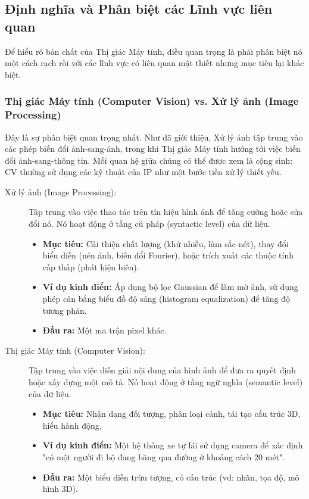 \subsection{Định nghĩa và Phân biệt các Lĩnh vực liên quan}

Để hiểu rõ bản chất của Thị giác Máy tính, điều quan trọng là phải phân biệt nó một cách rạch ròi với các lĩnh vực có liên quan mật thiết nhưng mục tiêu lại khác biệt.

\subsubsection{Thị giác Máy tính (Computer Vision) vs. Xử lý ảnh (Image Processing)}

Đây là sự phân biệt quan trọng nhất. Như đã giới thiệu, Xử lý ảnh tập trung vào các phép biến đổi ảnh-sang-ảnh, trong khi Thị giác Máy tính hướng tới việc biến đổi ảnh-sang-thông tin. Mối quan hệ giữa chúng có thể được xem là cộng sinh: CV thường sử dụng các kỹ thuật của IP như một bước tiền xử lý thiết yếu.

\begin{description}
    \item[Xử lý ảnh (Image Processing):] Tập trung vào việc thao tác trên tín hiệu hình ảnh để tăng cường hoặc sửa đổi nó. Nó hoạt động ở tầng cú pháp (syntactic level) của dữ liệu.
    \begin{itemize}
        \item \textbf{Mục tiêu:} Cải thiện chất lượng (khử nhiễu, làm sắc nét), thay đổi biểu diễn (nén ảnh, biến đổi Fourier), hoặc trích xuất các thuộc tính cấp thấp (phát hiện biên).
        \item \textbf{Ví dụ kinh điển:} Áp dụng bộ lọc Gaussian để làm mờ ảnh, sử dụng phép cân bằng biểu đồ độ sáng (histogram equalization) để tăng độ tương phản.
        \item \textbf{Đầu ra:} Một ma trận pixel khác.
    \end{itemize}
    \item[Thị giác Máy tính (Computer Vision):] Tập trung vào việc diễn giải nội dung của hình ảnh để đưa ra quyết định hoặc xây dựng một mô tả. Nó hoạt động ở tầng ngữ nghĩa (semantic level) của dữ liệu.
    \begin{itemize}
        \item \textbf{Mục tiêu:} Nhận dạng đối tượng, phân loại cảnh, tái tạo cấu trúc 3D, hiểu hành động.
        \item \textbf{Ví dụ kinh điển:} Một hệ thống xe tự lái sử dụng camera để xác định "có một người đi bộ đang băng qua đường ở khoảng cách 20 mét".
        \item \textbf{Đầu ra:} Một biểu diễn trừu tượng, có cấu trúc (vd: nhãn, tọa độ, mô hình 3D).
    \end{itemize}
\end{description}

